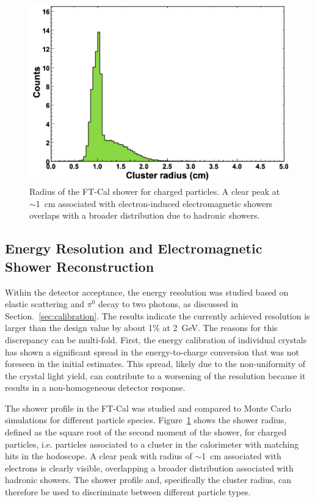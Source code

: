 \begin{figure}[h]
\includegraphics[height=0.65\columnwidth]{fig/ft_shower.png}
\caption{Radius of the FT-Cal shower for charged particles. A clear peak at $\sim$1~cm associated with
  electron-induced electromagnetic showers overlaps with a broader distribution due to hadronic showers.}
\label{fig:ft_shower}
\end{figure}

\subsection{Energy Resolution and Electromagnetic Shower Reconstruction}

Within the detector acceptance, the energy resolution was studied based on elastic scattering and $\pi^0$ decay to
two photons, as discussed in Section.~\ref{sec:calibration}. The results indicate the currently achieved resolution is
larger than the design value by about 1\% at 2~GeV. The reasons for this discrepancy can be multi-fold. First, the
energy calibration of individual crystals has shown a significant spread in the energy-to-charge conversion that was
not foreseen in the initial estimates. This spread, likely due to the non-uniformity of the crystal light yield, can
contribute to a worsening of the resolution because it results in a non-homogeneous detector response. 

The shower profile in the FT-Cal was studied and compared to Monte Carlo simulations for different particle
species. Figure~\ref{fig:ft_shower} shows the shower radius, defined as the square root of the second moment of
the shower, for charged particles, i.e. particles associated to a cluster in the calorimeter with matching hits in the
hodoscope. A clear peak with radius of $\sim$1~cm associated with electrons is clearly visible, overlapping a
broader distribution associated with hadronic showers. The shower profile and, specifically the cluster radius, can
therefore be used to discriminate between different particle types.

